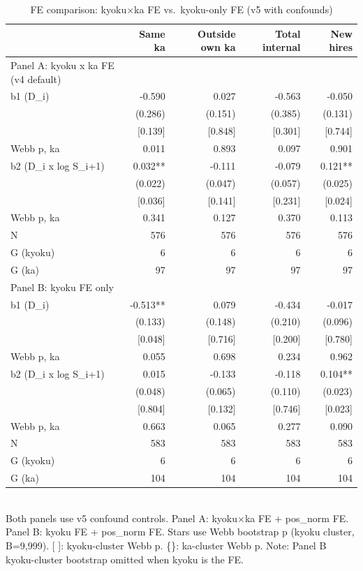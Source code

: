 \begin{table}[!htbp]
  \centering
  \caption{FE comparison: kyoku$\times$ka FE vs.~kyoku-only FE (v5 with confounds)}
  \label{tab:v5_fe_comparison}
  \begin{tabular}{lrrrr}
    \hline\hline
     & Same ka & Outside own ka & Total internal & New hires \\
    \hline
    Panel A: kyoku x ka FE (v4 default) &  &  &  &  \\
    b1 (D_i) & -0.590 & 0.027 & -0.563 & -0.050 \\
     & (0.286) & (0.151) & (0.385) & (0.131) \\
    [Webb p, kyoku] & [0.139] & [0.848] & [0.301] & [0.744] \\
    {Webb p, ka} & {0.011} & {0.893} & {0.097} & {0.901} \\
    b2 (D_i x log S_i+1) & 0.032** & -0.111 & -0.079 & 0.121** \\
     & (0.022) & (0.047) & (0.057) & (0.025) \\
    [Webb p, kyoku] & [0.036] & [0.141] & [0.231] & [0.024] \\
    {Webb p, ka} & {0.341} & {0.127} & {0.370} & {0.113} \\
    \hline
    N & 576 & 576 & 576 & 576 \\
    G (kyoku) & 6 & 6 & 6 & 6 \\
    G (ka) & 97 & 97 & 97 & 97 \\
    \hline
    Panel B: kyoku FE only &  &  &  &  \\
    b1 (D_i) & -0.513** & 0.079 & -0.434 & -0.017 \\
     & (0.133) & (0.148) & (0.210) & (0.096) \\
    [Webb p, kyoku] & [0.048] & [0.716] & [0.200] & [0.780] \\
    {Webb p, ka} & {0.055} & {0.698} & {0.234} & {0.962} \\
    b2 (D_i x log S_i+1) & 0.015 & -0.133 & -0.118 & 0.104** \\
     & (0.048) & (0.065) & (0.110) & (0.023) \\
    [Webb p, kyoku] & [0.804] & [0.132] & [0.746] & [0.023] \\
    {Webb p, ka} & {0.663} & {0.065} & {0.277} & {0.090} \\
    \hline
    N & 583 & 583 & 583 & 583 \\
    G (kyoku) & 6 & 6 & 6 & 6 \\
    G (ka) & 104 & 104 & 104 & 104 \\
    \hline\hline
  \end{tabular}
  \\[4pt]
  \footnotesize Both panels use v5 confound controls. Panel A: kyoku$\times$ka FE + pos\_norm FE. Panel B: kyoku FE + pos\_norm FE. Stars use Webb bootstrap p (kyoku cluster, B=9,999). [ ]: kyoku-cluster Webb p. \{\}: ka-cluster Webb p. Note: Panel B kyoku-cluster bootstrap omitted when kyoku is the FE.
\end{table}
